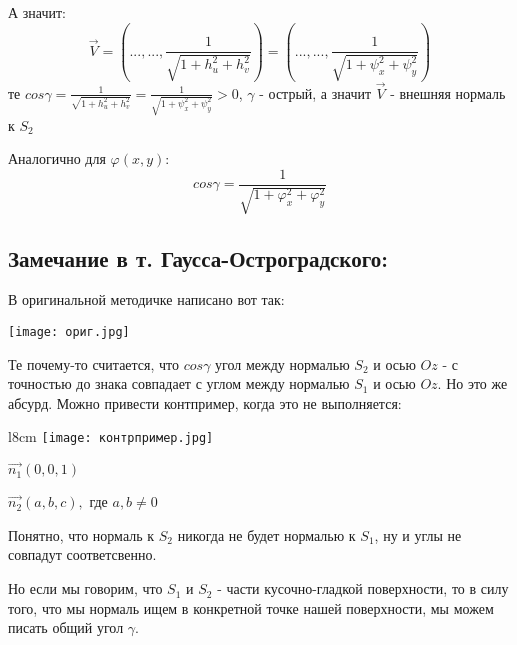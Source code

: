 \documentclass[12pt]{article}
\begin{document}
А значит:
$$
\vec{V} = ( ..., ... , \frac{1}{\sqrt{1+h_u^2 + h_v^2}})
=
( ..., ... , \frac{1}{\sqrt{1+\psi_x^2 + \psi_y^2}})
$$
те $cos\gamma = \frac{1}{\sqrt{1+h_u^2 + h_v^2}} = \frac{1}{\sqrt{1+\psi_x^2 + \psi_y^2}}> 0$, $\gamma$ - острый, а значит $\vec{V}$ - внешняя нормаль к $S_2$

Аналогично для $\varphi(x,y)$:
$$cos\gamma = \frac{1}{\sqrt{1 + \varphi_x^2 + \varphi_y^2 }} $$

\subsection{Замечание в т. Гаусса-Остроградского:}\label{eq11}
	В оригинальной методичке написано вот так:
	
	\texttt{[image: ориг.jpg]}	
	
	Те почему-то считается, что $cos\gamma$ угол между нормалью $S_2$ и осью $Oz$ - с точностью до знака совпадает с углом между нормалью $S_1$ и осью $Oz$. Но это же абсурд. Можно привести контпример, когда это не выполняется:
	
	\begin{wrapfigure}{l}{8cm}
	\texttt{[image: контрпример.jpg]}
	\end{wrapfigure}
	
	$\vec{n_1}(0 , 0 , 1)$
	
	$\vec{n_2}(a , b , c), $ где $a,b \neq 0$

	Понятно, что нормаль к $S_2$ никогда не будет нормалью к $S_1$, ну и углы не совпадут соответсвенно.
	
	Но если мы говорим, что $S_1$ и $S_2$ - части кусочно-гладкой поверхности, то в силу того, что мы нормаль ищем в конкретной точке нашей поверхности, мы можем писать общий угол $\gamma$.
\end{document}

